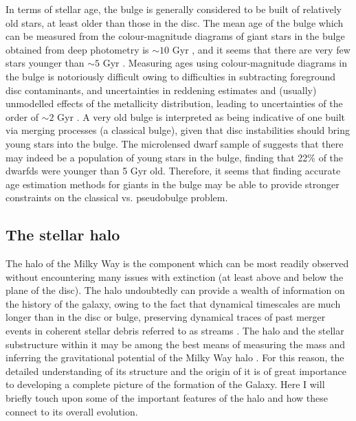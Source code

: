 In terms of stellar age, the bulge is generally considered to be built of relatively old stars, at least older than those in the disc. The mean age of the bulge which can be measured from the colour-magnitude diagrams of giant stars in the bulge obtained from deep photometry is $\sim 10$ Gyr \citep[e.g.][]{2003A&A...399..931Z,2013A&A...559A..98V}, and it seems that there are very few stars younger than $\sim 5$ Gyr \citep{2011ApJ...735...37C}. Measuring ages using colour-magnitude diagrams in the bulge is notoriously difficult owing to difficulties in subtracting foreground disc contaminants, and uncertainties in reddening estimates and (usually) unmodelled effects of the metallicity distribution, leading to uncertainties of the order of $\sim 2$ Gyr \citep{2016ASSL..418..199G}. A very old bulge is interpreted as being indicative of one built via merging processes (a classical bulge), given that disc instabilities should bring young stars into the bulge. The microlensed dwarf sample of \citet{2013A&A...549A.147B} suggests that there may indeed be a population of young stars in the bulge, finding that 22\% of the dwarfds were younger than 5 Gyr old. Therefore, it seems that finding accurate age estimation methods for giants in the bulge may be able to provide stronger constraints on the classical vs. pseudobulge problem.

\subsection{The stellar halo}
The halo of the Milky Way is the component which can be most readily observed without encountering many issues with extinction (at least above and below the plane of the disc). The halo undoubtedly can provide a wealth of information on the history of the galaxy, owing to the fact that dynamical timescales are much longer than in the disc or bulge, preserving dynamical traces of past merger events in coherent stellar debris referred to as streams \citep[e.g.][]{1996ApJ...465..278J}. The halo and the stellar substructure within it may be among the best means of measuring the mass and inferring the gravitational potential of the Milky Way halo \citep[e.g.][]{2014ApJ...794....4P}. For this reason, the detailed understanding of its structure and the origin of it is of great importance to developing a complete picture of the formation of the Galaxy. Here I will briefly touch upon some of the important features of the halo and how these connect to its overall evolution.

